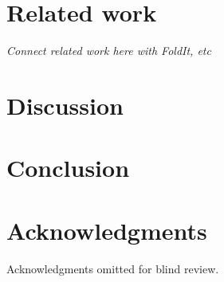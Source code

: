 \documentclass{sigchi}
\begin{document}
\section{Related work}

\emph{Connect related work here with FoldIt, etc}

\section{Discussion}

\section{Conclusion}

\section{Acknowledgments}
Acknowledgments omitted for blind review.

\balance






\end{document}
